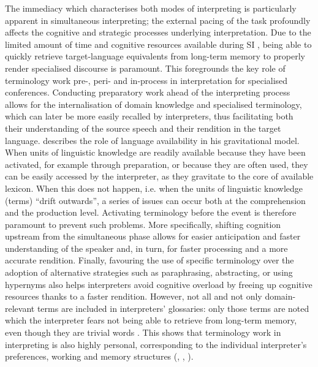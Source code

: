 The immediacy which characterises both modes of interpreting \citep[10]{pochhacker2011simultaneous} is particularly apparent in simultaneous interpreting; the external pacing of the task profoundly affects the cognitive and strategic processes underlying interpretation. Due to the limited amount of time and cognitive resources available during SI \citep[49]{rutten2013TM}, being able to quickly retrieve tar\-get-lan\-guage equivalents from long-term memory to properly render specialised discourse is paramount. This foregrounds the key role of terminology work pre-, peri- and in-process in interpretation for specialised conferences.
Conducting preparatory work ahead of the interpreting process allows for the internalisation of domain knowledge and specialised terminology, which can later be more easily recalled by interpreters, thus facilitating both their understanding of the source speech and their rendition in the target language. \citet{gile_basic_2009} describes the role of language availability in his gravitational model. When units of linguistic knowledge are readily available because they have been activated, for example through preparation, or because they are often used, they can be easily accessed by the interpreter, as they gravitate to the core of available lexicon. When this does not happen, i.e. when the units of linguistic knowledge (terms) ``drift outwards'', a series of issues can occur both at the comprehension and the production level. Activating terminology before the event is therefore paramount to prevent such problems. More specifically, shifting cognition upstream from the simultaneous phase \citep[3]{stoll_heidelberg_2010} allows for easier anticipation and faster understanding of the speaker and, in turn, for faster processing and a more accurate rendition. Finally, favouring the use of specific terminology over the adoption of alternative strategies such as paraphrasing, abstracting, or using hypernyms also helps interpreters avoid cognitive overload by freeing up cognitive resources thanks to a faster rendition. However, not all and not only domain-relevant terms are included in interpreters' glossaries: only those terms are noted which the interpreter fears not being able to retrieve from long-term memory, even though they are trivial words \citep[42]{rutten2011TMS}. This shows that terminology work in interpreting is also highly personal, corresponding to the individual interpreter's preferences, working and memory structures (\citealt[48]{rutten2012TM}, \citealt[9]{wagener2012vorbereitende}, \citealt[147]{rutten2018boothnotes}).

